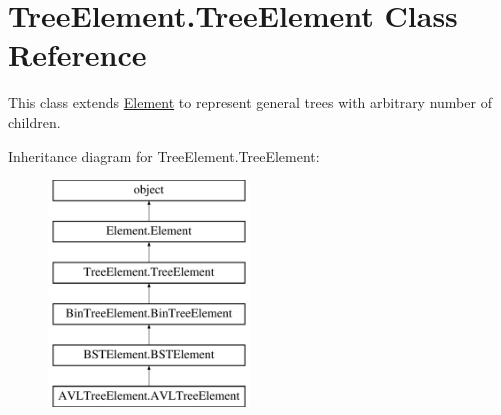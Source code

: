 \hypertarget{class_tree_element_1_1_tree_element}{}\section{Tree\+Element.\+Tree\+Element Class Reference}
\label{class_tree_element_1_1_tree_element}


This class extends \hyperlink{namespace_element}{Element} to represent general trees with arbitrary number of children.  


Inheritance diagram for Tree\+Element.\+Tree\+Element\+:\begin{figure}[H]
\begin{center}
\leavevmode
\includegraphics[height=6.000000cm]{class_tree_element_1_1_tree_element}
\end{center}
\end{figure}
